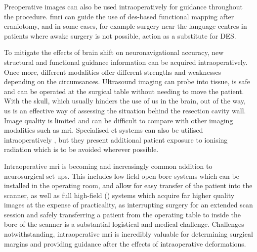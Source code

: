 Preoperative images can also be used intraoperatively for guidance throughout the procedure.
\gls{fmri} can guide the use of \gls{des}-based functional mapping after craniotomy, and in some cases, for example surgery near the language centres in patients where awake surgery is not possible, action as a substitute for DES.


To mitigate the effects of brain shift on neuronavigational accuracy, new structural and functional guidance information can be acquired intraoperatively.
Once more, different modalities offer different strengths and weaknesses depending on the circumsances.
Ultrasound imaging can probe into tissue, is safe  and can be operated at the surgical table without needing to move the patient.
With the skull, which usually hinders the use of \gls{us} in the brain, out of the way, \gls{us} is an effective way of assessing the situation behind the resection cavity wall.
Image quality is limited and can be difficult to compare with other imaging modalities such as \gls{mri}.
Specialised \gls{ct} systems can also be utilised intraoperatively \note{[examples]}, but they present additional patient exposure to ionising radiation which is to be avoided wherever possible.

Intraoperative \gls{mri} is becoming and increasingly common addition to neurosurgical set-ups.
This includes low field open bore systems which can be installed in the operating room, and allow for easy transfer of the patient into the scanner, as well as full high-field () systems which acquire far higher quality images at the expense of practicality, as interrupting surgery for an extended scan session and safely transferring a patient from the operating table to inside the bore of the scanner is a substantial logistical and medical challenge.
Challenges notwithstanding, intraoperative \gls{mri} is incredibly valuable for determining surgical margins and providing guidance after the effects of intraoperative deformations.

